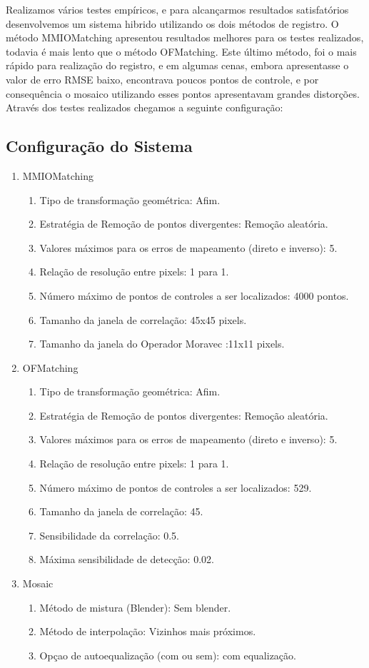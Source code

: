 \documentclass[9pt, a4paper, nofonttune, journal]{IEEEtran}
\begin{document}
Realizamos vários testes empíricos, e para alcançarmos resultados satisfatórios desenvolvemos um sistema hibrido utilizando os dois métodos de registro. O método MMIOMatching apresentou resultados melhores para os testes realizados, todavia é mais lento que o método OFMatching. Este último método, foi o mais rápido para realização do registro, e em algumas cenas, embora apresentasse o valor de erro RMSE baixo, encontrava poucos pontos de controle, e por consequência o mosaico utilizando esses pontos apresentavam grandes distorções. Através dos testes realizados chegamos a seguinte configuração:

\subsection{Configuração do Sistema}
\begin{enumerate}
\item MMIOMatching
	\begin{enumerate}
	 \item Tipo de transformação geométrica: Afim.
	 \item Estratégia de Remoção de pontos divergentes: Remoção aleatória.
	 \item Valores máximos para os erros de mapeamento (direto e inverso): 5.
	 \item Relação de resolução entre pixels: 1 para 1.
	 \item Número máximo de pontos de controles a ser localizados: 4000 pontos.
	 \item Tamanho da janela de correlação: 45x45 pixels.
	 \item Tamanho da janela do Operador Moravec :11x11 pixels.
	\end{enumerate}
 \item OFMatching
	 \begin{enumerate}
	  \item Tipo de transformação geométrica: Afim.
	  \item Estratégia de Remoção de pontos divergentes: Remoção aleatória.
	  \item Valores máximos para os erros de mapeamento (direto e inverso): 5.
	  \item Relação de resolução entre pixels: 1 para 1.
	  \item Número máximo de pontos de controles a ser localizados: 529.
	  \item Tamanho da janela de correlação: 45.
	  \item Sensibilidade da correlação: 0.5.
	  \item Máxima sensibilidade de detecção: 0.02.
	 \end{enumerate}
 \item Mosaic
	 \begin{enumerate}
	  \item Método de mistura (Blender): Sem blender.
	  \item Método de interpolação: Vizinhos mais próximos.
	  \item Opçao de autoequalização (com ou sem): com equalização.
	 \end{enumerate}
\end{enumerate}
\end{document}
